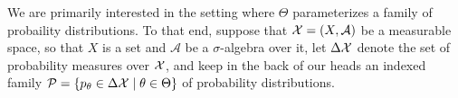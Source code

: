 \documentclass{article}
\begin{document}
We are primarily interested in the setting where $\Theta$ parameterizes a family of probaility distributions.
To that end, suppose that $\mathcal X = (X, \mathcal A)$ be a measurable space, so that $X$ is a set and $\mathcal A$ be a $\sigma$-algebra over it, let $\Delta \mathcal X$ denote the set of probability measures over $\mathcal X$,
and keep in the back of our heads an indexed family
$
    \mathcal P =
    \{ p_\theta \in\Delta\mathcal X \mid \theta \in \Theta \}
$ of probability distributions.

%
\end{document}
